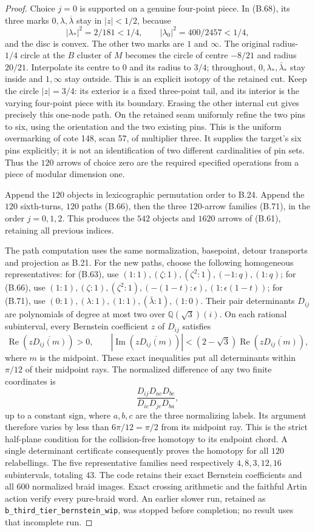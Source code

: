\begin{proof}
Choice $j=0$ is supported on a genuine four-point piece.
In (B.68), its three marks $0,\lambda,\overline\lambda$
stay in $|z|<1/2$, because
\[
 |\lambda_*|^2=2/181<1/4,\qquad
 |\lambda_0|^2=400/2457<1/4,
\]
and the disc is convex.  The other two marks are $1$
and $\infty$.  The original radius-$1/4$ circle at the $B$ cluster of $M$
becomes the circle of centre $-8/21$ and radius $20/21$.
Interpolate its centre to $0$ and its radius to $3/4$;
throughout, $0,\lambda_*,\bar\lambda_*$ stay inside
and $1,\infty$ stay outside.  This is an explicit isotopy
of the retained cut.  Keep the circle $|z|=3/4$: its exterior
is a fixed three-point tail, and its interior is the
varying four-point piece with its boundary.  Erasing
the other internal cut gives precisely this one-node
path.  On the retained seam uniformly refine the
two pins to six, using the orientation and the two
existing pins.  This is the uniform overmarking of
cote 148, scan 57, of multiplier three.  It supplies
the target's six pins explicitly; it is not an
identification of two different cardinalities of pin sets.
Thus the $120$ arrows of choice zero are the required
specified operations from a piece of modular dimension one.

Append the $120$ objects in lexicographic permutation
order to B.24.  Append the $120$ sixth-turns, $120$
paths (B.66), then the three $120$-arrow families
(B.71), in the order $j=0,1,2$.  This produces the
$542$ objects and $1620$ arrows of (B.61), retaining
all previous indices.

The path computation uses the same normalization,
basepoint, detour transports and projection as B.21.
For the new paths, choose the following homogeneous representatives:
for (B.63), use $(1:1),(\zeta:1),(\zeta^2:1),(-1:q),(1:q)$;
for (B.66), use $(1:1),(\zeta:1),(\zeta^2:1),
(-(1-t):\epsilon),(1:\epsilon(1-t))$; for (B.71), use
$(0:1),(\lambda:1),(1:1),(\bar\lambda:1),(1:0)$.
Their pair determinants $D_{ij}$ are polynomials of degree
at most two over $\mathbb Q(\sqrt3)(i)$.  On each rational
subinterval, every Bernstein coefficient $z$ of $D_{ij}$
satisfies
\[
 \operatorname{Re}(z\overline{D_{ij}(m)})>0,\qquad
 |\operatorname{Im}(z\overline{D_{ij}(m)})|
 <(2-\sqrt3)\operatorname{Re}(z\overline{D_{ij}(m)}),
\]
where $m$ is the midpoint.  These exact inequalities put
all determinants within $\pi/12$ of their midpoint rays.
The normalized difference of any two finite coordinates is
\[
 \frac{D_{ij}D_{ac}D_{bc}}{D_{ic}D_{jc}D_{ba}},
\]
up to a constant sign, where $a,b,c$ are the three
normalizing labels.  Its argument therefore varies by
less than $6\pi/12=\pi/2$ from its midpoint ray.  This
is the strict half-plane condition for the collision-free
homotopy to its endpoint chord.  A single determinant
certificate consequently proves the homotopy for all
$120$ relabellings.  The five representative families
need respectively $4,8,3,12,16$ subintervals, totaling
$43$.  The code retains their exact Bernstein coefficients
and all $600$ normalized braid images.  Exact crossing
arithmetic and the faithful Artin action verify every
pure-braid word.  An earlier slower run, retained as
\texttt{b\_third\_tier\_bernstein\_wip}, was stopped
before completion; no result uses that incomplete run.


\end{proof}
